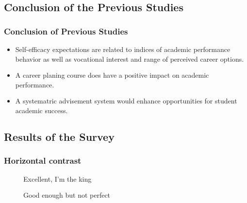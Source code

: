 \subsection{Conclusion of the Previous Studies}
\begin{frame}
    \frametitle{Conclusion of Previous Studies}
    \large
    \begin{itemize}[<+->]
        \item Self-efficacy expectations are related to indices of academic performance behavior as well as vocational interest and range of perceived career options.\cite{lent1986self}
        \item A career planing course does have a positive impact on academic performance.\cite{folsom2005impact}
        \item A systematric advisement system would enhance opportunities for student academic success.\cite{jones1983impact}
    \end{itemize}
\end{frame}

\subsection{Results of the Survey}
\begin{frame}
    \frametitle{Horizontal contrast}
    \tiny
    \begin{figure}[htbp]
        \centering
        \begin{minipage}[t]{0.4\textwidth}
            \centering
            \caption{Excellent, I’m the king} \label{fig:pie1}
        \end{minipage}
        \begin{minipage}[t]{0.4\textwidth}
            \centering
            \caption{Good enough but not perfect} \label{fig:pie2}
        \end{minipage}
    \end{figure}
\end{frame}

